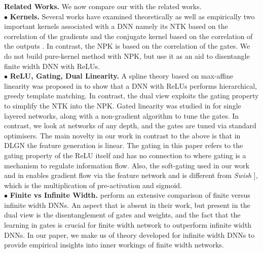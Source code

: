 \textbf{Related Works.} We now compare our with the related works.\\
$\bullet$ \textbf{Kernels.} Several works have examined theoretically as well as empirically two important kernels associated with a DNN namely its NTK based on the correlation of the gradients and the conjugate kernel based on the correlation of the outputs \citep{spectra,laplace,belkin,genntk,disentangling,ntk,arora2019exact,convgp,fcgp,lee2020finite}. In contrast, the NPK is based on the correlation of the gates. We do not build pure-kernel method with NPK, but use it as an aid to disentangle finite width DNN with ReLUs.\\  %
$\bullet$ \textbf{ReLU, Gating, Dual Linearity.} A spline theory based on max-affine linearity was proposed in \citep{balestriero2018spline,balestriero2018hard} to show that a DNN with ReLUs performs hierarchical, greedy template matching. In contrast, the dual view exploits the gating property to simplify the NTK into the NPK. Gated linearity was studied in \citep{sss} for single layered networks, along with a non-gradient algorithm to tune the gates. In contrast, we look at networks of any depth, and the gates are tuned via standard optimisers. The main novelty in our work in contrast to the above is that in DLGN the feature generation is linear. The gating in this paper refers to the gating property of the ReLU itself and has no connection to \citep{highway}  where gating is a mechanism to regulate information flow. Also, the soft-gating used in our work and in \citep{npk} enables gradient flow via the feature network and is different from \emph{Swish} ]\citep{swish}, which is the multiplication of pre-activation and sigmoid.\\
$\bullet$ \textbf{Finite vs Infinite Width.} \cite{finitevsinfinite} perform an extensive comparison of finite versus infinite width DNNs. An aspect that is absent in their work, but present in the dual view is the disentanglement of gates and weights, and the fact that the learning in gates is crucial for finite width network to outperform infinite width DNNs. In our paper, we make us of theory developed for infinite width DNNs to provide empirical insights into inner workings of finite width networks.\\
